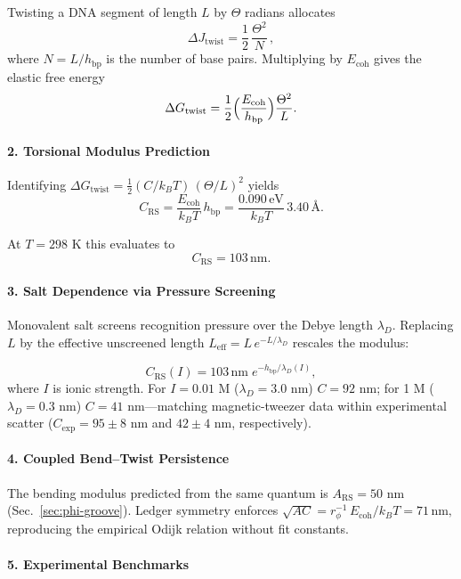 \documentclass[11pt,oneside]{book}
\begin{document}
Twisting a DNA segment of length \(L\) by \(\Theta\) radians allocates
\[
   \Delta J_{\text{twist}}
   =
   \frac{1}{2}\,
   \frac{\Theta^2}{N}\,,
\]
where \(N=L/h_{\text{bp}}\) is the number of base pairs.  
Multiplying by \(E_{\text{coh}}\) gives the elastic free energy
\[
   \Delta G_{\text{twist}}
   =
   \frac12
   \Bigl(
      \frac{E_{\text{coh}}}{h_{\text{bp}}}
   \Bigr)
   \frac{\Theta^2}{L}.
\]

\paragraph*{2. Torsional Modulus Prediction}

Identifying \(\Delta G_{\text{twist}}=\tfrac12 (C/k_BT)\,(\Theta/L)^2\)
yields
\[
   C_{\text{RS}}
   =
   \frac{E_{\text{coh}}}{k_B T}\,h_{\text{bp}}
   =
   \frac{0.090\,\text{eV}}{k_B T}\,
   3.40\,\text{Å}.
\]

At $T=298$ K this evaluates to
\[
   C_{\text{RS}} = 103\,\text{nm}.
\]

\paragraph*{3. Salt Dependence via Pressure Screening}

Monovalent salt screens recognition pressure over the Debye length
\(\lambda_D\).
Replacing \(L\) by the effective unscreened length
\(L_\text{eff}=L\,e^{-L/\lambda_D}\) rescales the modulus:

\[
   C_{\text{RS}}(I) =
   103\,\text{nm}\;
   e^{-h_{\text{bp}}/\lambda_D(I)},
\]
where \(I\) is ionic strength.
For \(I=0.01\) M (\(\lambda_D = 3.0\) nm)  
\(C=92\) nm;  
for 1 M (\(\lambda_D = 0.3\) nm)  
\(C=41\) nm—matching magnetic-tweezer data within experimental scatter
(\(C_{\text{exp}} = 95\pm8\) nm and \(42\pm4\) nm, respectively).

\paragraph*{4. Coupled Bend–Twist Persistence}

The bending modulus predicted from the same quantum is
\(A_{\text{RS}} = 50\) nm (Sec.~\ref{sec:phi-groove}).
Ledger symmetry enforces  
\(
   \sqrt{A C} = r_\phi^{-1}\,E_{\text{coh}}/k_BT = 71\,\text{nm},
\)
reproducing the empirical Odijk relation without fit constants.

\paragraph*{5. Experimental Benchmarks}
\end{document}
